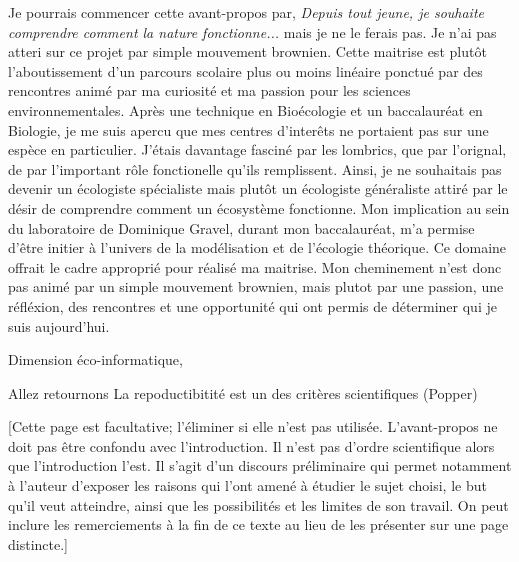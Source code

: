 Je pourrais commencer cette avant-propos par, \textit{Depuis tout jeune, je souhaite comprendre
comment la nature fonctionne...} mais je ne le ferais pas. Je n'ai pas atteri sur ce projet par
simple mouvement brownien. Cette maitrise est plutôt l'aboutissement d'un parcours scolaire plus ou
moins linéaire ponctué par des rencontres animé par ma curiosité et ma passion pour les sciences
environnementales. Après une technique en Bioécologie et un baccalauréat en Biologie, je me suis
apercu que mes centres d'interêts ne portaient pas sur une espèce en particulier. J'étais davantage
fasciné par les lombrics, que par l'orignal, de par l'important rôle fonctionelle qu'ils
remplissent. Ainsi, je ne souhaitais pas devenir un écologiste spécialiste mais plutôt un écologiste
généraliste attiré par le désir de comprendre comment un écosystème fonctionne. Mon implication au
sein du laboratoire de Dominique Gravel, durant mon baccalauréat, m'a permise d'être initier à
l'univers de la modélisation et de l'écologie théorique. Ce domaine offrait le cadre approprié pour
réalisé ma maitrise. Mon cheminement n'est donc pas animé par un simple mouvement brownien, mais
plutot par une passion, une réfléxion, des rencontres et une opportunité qui ont permis de
déterminer qui je suis aujourd'hui.

Dimension éco-informatique,

Allez retournons
La repoductibitité est un des critères scientifiques (Popper)

[Cette page est facultative; l’éliminer si elle n’est pas utilisée. L’avant-propos ne doit pas être confondu avec l'introduction. Il n’est pas d’ordre scientifique alors que l’introduction l’est. Il s’agit d'un discours préliminaire qui permet notamment à l'auteur d'exposer les raisons qui l'ont amené à étudier le sujet choisi, le but qu'il veut atteindre, ainsi que les possibilités et les limites de son travail. On peut inclure les remerciements à la fin de ce texte au lieu de les présenter sur une page distincte.]


